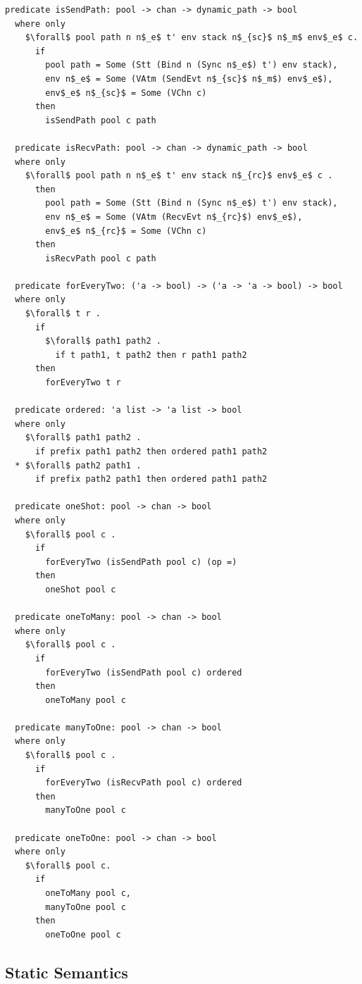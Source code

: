 \documentclass[letterpaper, 11pt]{extarticle}
\begin{document}
\begin{lstlisting}[language=logic, mathescape]
  predicate isSendPath: pool -> chan -> dynamic_path -> bool
  where only
    $\forall$ pool path n n$_e$ t' env stack n$_{sc}$ n$_m$ env$_e$ c.
      if
        pool path = Some (Stt (Bind n (Sync n$_e$) t') env stack),
        env n$_e$ = Some (VAtm (SendEvt n$_{sc}$ n$_m$) env$_e$), 
        env$_e$ n$_{sc}$ = Some (VChn c)
      then
        isSendPath pool c path

  predicate isRecvPath: pool -> chan -> dynamic_path -> bool
  where only
    $\forall$ pool path n n$_e$ t' env stack n$_{rc}$ env$_e$ c .
      then
        pool path = Some (Stt (Bind n (Sync n$_e$) t') env stack),
        env n$_e$ = Some (VAtm (RecvEvt n$_{rc}$) env$_e$),
        env$_e$ n$_{rc}$ = Some (VChn c)
      then
        isRecvPath pool c path

  predicate forEveryTwo: ('a -> bool) -> ('a -> 'a -> bool) -> bool
  where only
    $\forall$ t r .
      if
        $\forall$ path1 path2 .
          if t path1, t path2 then r path1 path2
      then
        forEveryTwo t r

  predicate ordered: 'a list -> 'a list -> bool
  where only
    $\forall$ path1 path2 .
      if prefix path1 path2 then ordered path1 path2
  * $\forall$ path2 path1 .
      if prefix path2 path1 then ordered path1 path2

  predicate oneShot: pool -> chan -> bool
  where only
    $\forall$ pool c .
      if
        forEveryTwo (isSendPath pool c) (op =)
      then
        oneShot pool c

  predicate oneToMany: pool -> chan -> bool
  where only
    $\forall$ pool c .
      if
        forEveryTwo (isSendPath pool c) ordered
      then
        oneToMany pool c

  predicate manyToOne: pool -> chan -> bool
  where only
    $\forall$ pool c .
      if
        forEveryTwo (isRecvPath pool c) ordered
      then
        manyToOne pool c

  predicate oneToOne: pool -> chan -> bool
  where only
    $\forall$ pool c.
      if
        oneToMany pool c,
        manyToOne pool c
      then
        oneToOne pool c
\end{lstlisting}


\subsection{Static Semantics}
\end{document}
